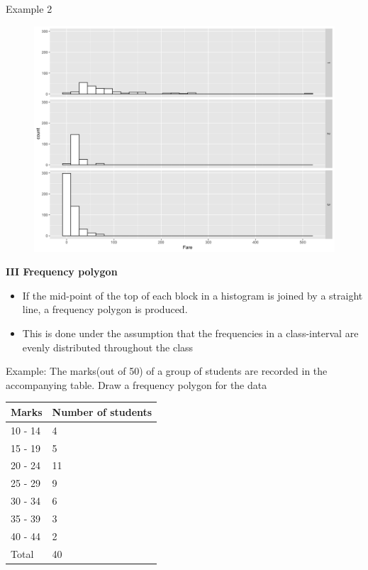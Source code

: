 \documentclass[]{book}
\providecommand{\tightlist}{%
  \setlength{\itemsep}{0pt}\setlength{\parskip}{0pt}}
\begin{document}
Example 2

\begin{figure}

{\centering \includegraphics[width=1\linewidth]{figure/box18-1} 

}

\end{figure}

\textbf{III Frequency polygon}

\begin{itemize}
\tightlist
\item
  If the mid-point of the top of each block in a histogram is joined by a straight line, a frequency polygon is produced.
\item
  This is done under the assumption that the frequencies in a class-interval are evenly distributed throughout the class
\end{itemize}

Example: The marks(out of 50) of a group of students are recorded in the accompanying table. Draw a frequency polygon for the data

\begin{longtable}[]{@{}ll@{}}
\toprule
Marks & Number of students\tabularnewline
\midrule
\endhead
10 - 14 & 4\tabularnewline
15 - 19 & 5\tabularnewline
20 - 24 & 11\tabularnewline
25 - 29 & 9\tabularnewline
30 - 34 & 6\tabularnewline
35 - 39 & 3\tabularnewline
40 - 44 & 2\tabularnewline
Total & 40\tabularnewline
\bottomrule
\end{longtable}
\end{document}
